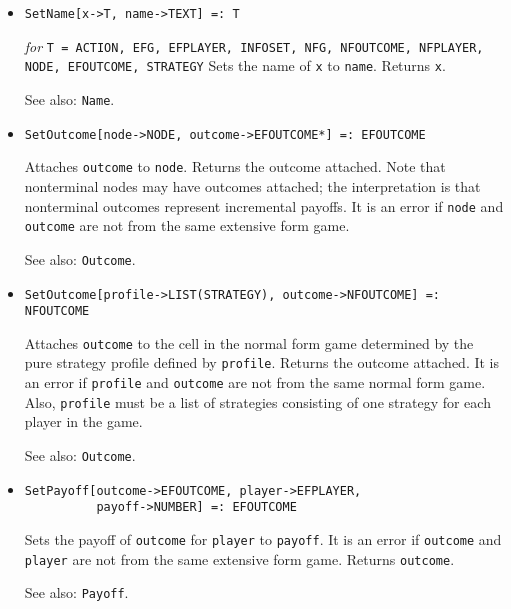 \begin{itemize}
\item{}
\protect \large \begin{verbatim}
SetName[x->T, name->TEXT] =: T
\end{verbatim}\normalsize

{\it for} {\tt T = ACTION, EFG, EFPLAYER, INFOSET, NFG, NFOUTCOME, 
NFPLAYER, NODE, EFOUTCOME, STRATEGY}
\bd
Sets the name of \verb+x+ to \verb+name+.  Returns \verb+x+.
\item [See also:] \verb+Name+.
\ed

\item{}
\protect \large \begin{verbatim} 
SetOutcome[node->NODE, outcome->EFOUTCOME*] =: EFOUTCOME 
\end{verbatim}\normalsize

\bd
Attaches \verb+outcome+ to \verb+node+.  Returns the outcome attached.
Note that nonterminal nodes may have outcomes attached; the interpretation
is that nonterminal outcomes represent incremental payoffs.  
It is an error if \verb+node+ and \verb+outcome+ are not from the same
extensive form game.
\item [See also:] \verb+Outcome+.
\ed

\item{}
\protect \large \begin{verbatim} 
SetOutcome[profile->LIST(STRATEGY), outcome->NFOUTCOME] =: NFOUTCOME 
\end{verbatim}\normalsize

\bd 
Attaches \verb+outcome+ to the cell in the normal form game
determined by the pure strategy profile defined by \verb+profile+.
Returns the outcome attached.  It is an error if \verb+profile+ and
\verb+outcome+ are not from the same normal form game. Also,
\verb+profile+ must be a list of strategies consisting of one strategy
for each player in the game.  
\item [See also:] \verb+Outcome+.
\ed

\item{}
\protect \large \begin{verbatim}
SetPayoff[outcome->EFOUTCOME, player->EFPLAYER,
          payoff->NUMBER] =: EFOUTCOME 
\end{verbatim}\normalsize

\bd
Sets the payoff of \verb+outcome+ for \verb+player+ to \verb+payoff+.
It is an error if \verb+outcome+ and \verb+player+ are not from the
same extensive form game.  Returns \verb+outcome+.
\item [See also:] \verb+Payoff+.
\ed


\end{itemize}
